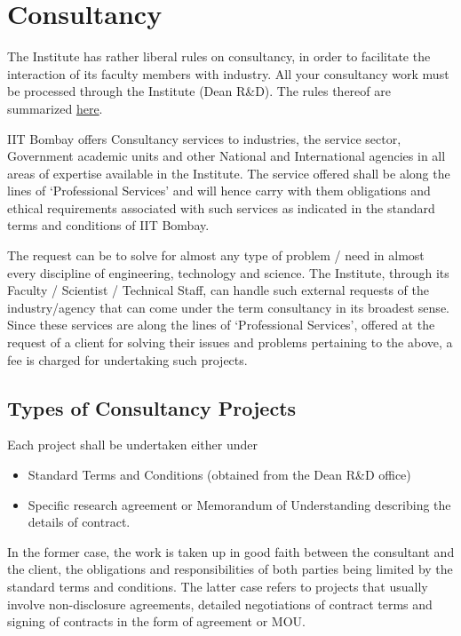 \documentclass[
  10pt,
  a5paper,
  10pt,
  openany]{amsbook}
\providecommand{\tightlist}{%
  \setlength{\itemsep}{0pt}\setlength{\parskip}{0pt}}
\begin{document}
\chapter{Consultancy}\label{sec:consultancy}

The Institute has rather liberal rules on consultancy, in order to
facilitate the interaction of its faculty members with industry. All
your consultancy work must be processed through the Institute (Dean
R\&D). The rules thereof are summarized
\href{https://rndhelp.ircc.iitb.ac.in/projects/consultancy-projects/revised-consultancy-practice-rules-and-norms-2003}{here}.

IIT Bombay offers Consultancy services to industries, the service
sector, Government academic units and other National and International
agencies in all areas of expertise available in the Institute. The
service offered shall be along the lines of `Professional Services' and
will hence carry with them obligations and ethical requirements
associated with such services as indicated in the standard terms and
conditions of IIT Bombay.

The request can be to solve for almost any type of problem / need in
almost every discipline of engineering, technology and science. The
Institute, through its Faculty / Scientist / Technical Staff, can handle
such external requests of the industry/agency that can come under the
term consultancy in its broadest sense. Since these services are along
the lines of `Professional Services', offered at the request of a client
for solving their issues and problems pertaining to the above, a fee is
charged for undertaking such projects.

\section{Types of Consultancy
Projects}\label{types-of-consultancy-projects}

Each project shall be undertaken either under

\begin{itemize}
\tightlist
\item
  Standard Terms and Conditions (obtained from the Dean R\&D office)
\item
  Specific research agreement or Memorandum of Understanding describing
  the details of contract.
\end{itemize}

In the former case, the work is taken up in good faith between the
consultant and the client, the obligations and responsibilities of both
parties being limited by the standard terms and conditions. The latter
case refers to projects that usually involve non-disclosure agreements,
detailed negotiations of contract terms and signing of contracts in the
form of agreement or MOU.
\end{document}
